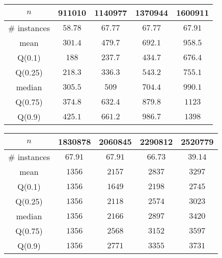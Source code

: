 \begin{tabular}{c|cccc} 
\hline 
$n$ & 911010 & 1140977 & 1370944 & 1600911 \tabularnewline 
\hline 
\hline 
\# instances & $58.78$ & $67.77$ & $67.77$ & $67.91$ \tabularnewline 
mean & $301.4$ & $479.7$ & $692.1$ & $958.5$ \tabularnewline 
Q(0.1) & $188$ & $237.7$ & $434.7$ & $676.4$ \tabularnewline 
Q(0.25) & $218.3$ & $336.3$ & $543.2$ & $755.1$ \tabularnewline 
median & $305.5$ & $509$ & $704.4$ & $990.1$ \tabularnewline 
Q(0.75) & $374.8$ & $632.4$ & $879.8$ & $1123$ \tabularnewline 
Q(0.9) & $425.1$ & $661.2$ & $986.7$ & $1398$ \tabularnewline 
\hline 
\end{tabular} 
\medskip{} 

\begin{tabular}{c|cccc} 
\hline 
$n$ & 1830878 & 2060845 & 2290812 & 2520779 \tabularnewline 
\hline 
\hline 
\# instances & $67.91$ & $67.91$ & $66.73$ & $39.14$ \tabularnewline 
mean & $1356$ & $2157$ & $2837$ & $3297$ \tabularnewline 
Q(0.1) & $1356$ & $1649$ & $2198$ & $2745$ \tabularnewline 
Q(0.25) & $1356$ & $2118$ & $2574$ & $3023$ \tabularnewline 
median & $1356$ & $2166$ & $2897$ & $3420$ \tabularnewline 
Q(0.75) & $1356$ & $2568$ & $3152$ & $3597$ \tabularnewline 
Q(0.9) & $1356$ & $2771$ & $3355$ & $3731$ \tabularnewline 
\hline 
\end{tabular} 
\medskip{} 

